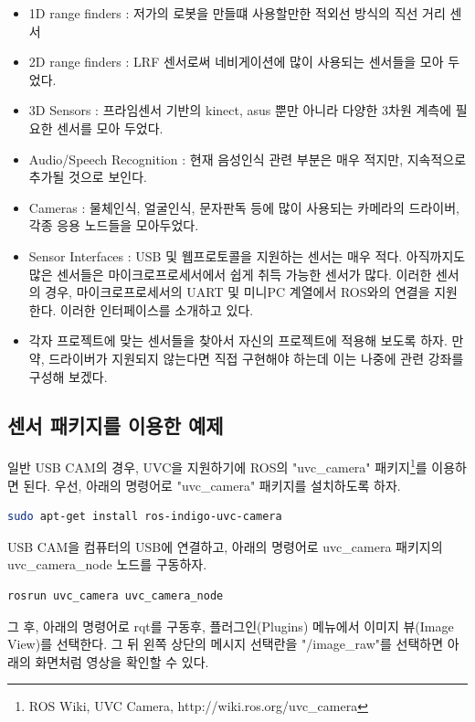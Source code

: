 \begin{itemize}[leftmargin=*]
\item 1D range finders : 저가의 로봇을 만들떄 사용할만한 적외선 방식의 직선 거리 센서
\item 2D range finders : LRF 센서로써 네비게이션에 많이 사용되는 센서들을 모아 두었다.
\item 3D Sensors : 프라임센서 기반의 kinect, asus 뿐만 아니라 다양한 3차원 계측에 필요한 센서를 모아 두었다.
\item Audio/Speech Recognition : 현재 음성인식 관련 부분은 매우 적지만, 지속적으로 추가될 것으로 보인다.
\item Cameras : 물체인식, 얼굴인식, 문자판독 등에 많이 사용되는 카메라의 드라이버, 각종 응용 노드들을 모아두었다.
\item Sensor Interfaces : USB 및 웹프로토콜을 지원하는 센서는 매우 적다. 아직까지도 많은 센서들은 마이크로프로세서에서 쉽게 취득 가능한 센서가 많다. 이러한 센서의 경우, 마이크로프로세서의 UART 및 미니PC 계열에서 ROS와의 연결을 지원한다. 이러한 인터페이스를 소개하고 있다.
 \item 각자 프로젝트에 맞는 센서들을 찾아서 자신의 프로젝트에 적용해 보도록 하자. 만약, 드라이버가 지원되지 않는다면 직접 구현해야 하는데 이는 나중에 관련 강좌를 구성해 보겠다.
\end{itemize}

\subsection{센서 패키지를 이용한 예제}

일반 USB CAM의 경우, UVC을 지원하기에 ROS의 "uvc\_camera" 패키지\footnote{ROS Wiki, UVC Camera, http://wiki.ros.org/uvc\_camera}를 이용하면 된다. 우선, 아래의 명령어로 "uvc\_camera" 패키지를 설치하도록 하자.

\begin{lstlisting}[language=bash]
sudo apt-get install ros-indigo-uvc-camera 
\end{lstlisting}

USB CAM을 컴퓨터의 USB에 연결하고, 아래의 명령어로 uvc\_camera 패키지의 uvc\_camera\_node 노드를 구동하자.

\begin{lstlisting}[language=bash]
rosrun uvc_camera uvc_camera_node
\end{lstlisting}

그 후, 아래의 명령어로 rqt를 구동후, 플러그인(Plugins) 메뉴에서 이미지 뷰(Image View)를 선택한다. 그 뒤 왼쪽 상단의 메시지 선택란을 "/image\_raw"를 선택하면 아래의 화면처럼 영상을 확인할 수 있다. 

